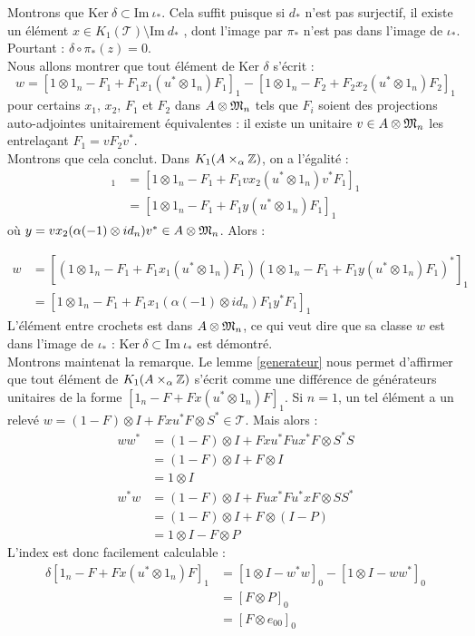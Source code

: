 \begin{dem}
Montrons que $\text{Ker}\ \delta \subset \text{Im}\ \iota_*$. Cela suffit puisque si $d_*$ n'est pas surjectif, il existe un élément $x\in K_1(\mathcal T)\setminus \text{Im}\ d_*$ , dont l'image par $\pi_*$ n'est pas dans l'image de $\iota_*$. Pourtant : $\delta\circ\pi_*( z) =0$.\\

Nous allons montrer que tout élément de $\text{Ker }\delta$ s'écrit :
\[w=[1\otimes 1_n -F_1+F_1x_1(u^*\otimes 1_n)F_1]_1-[1\otimes 1_n -F_2+F_2x_2(u^*\otimes 1_n)F_2]_1\]
pour certains $x_1$, $x_2$, $F_1$ et $F_2$ dans $A\otimes \frak M_n$ tels que $F_i$ soient des projections auto-adjointes unitairement équivalentes : il existe un unitaire $v\in A\otimes \frak M_n$ les entrelaçant $F_1=vF_2v^*$.\\

Montrons que cela conclut. Dans $K_1(A\times_\alpha \mathbb Z)$, on a l'égalité :
\begin{align*}
[1\otimes 1_n -F_2+F_2x_2(u^*\otimes 1_n)F_2]_1 & =[1\otimes 1_n -F_1+F_1 v x_2(u^*\otimes 1_n)v^* F_1]_1 \\
								& = [1\otimes 1_n -F_1+F_1 y (u^*\otimes 1_n)F_1]_1
\end{align*}
où $y=vx_2(\alpha(-1)\otimes id_n)v^*\in A\otimes \frak M_n$. Alors :

\begin{align*}
w & =[\left(1\otimes 1_n -F_1+F_1x_1(u^*\otimes 1_n)F_1\right)\left(1\otimes 1_n -F_1+F_1 y (u^*\otimes 1_n)F_1\right)^*]_1 \\
    & = [1\otimes 1_n -F_1+F_1 x_1 (\alpha(-1)\otimes id_n) F_1 y^* F_1]_1
\end{align*}
L'élément entre crochets est dans $A\otimes \frak M_n$, ce qui veut dire que sa classe $w$ est dans l'image de $\iota_*$ : $\text{Ker}\ \delta \subset \text{Im}\ \iota_*$ est démontré.\\

Montrons maintenat la remarque. Le lemme \ref{generateur} nous permet d'affirmer que tout élément de $K_1(A\times_\alpha \mathbb Z)$ s'écrit comme une différence de générateurs unitaires de la forme $[1_n-F+Fx(u^*\otimes 1_n)F]_1$. Si $n=1$, un tel élément a un relevé $w=(1-F)\otimes I+Fxu^*F\otimes S^*\in\mathcal T$. Mais alors :
\begin{align*}
ww^* &=(1-F)\otimes I + Fxu^*Fux^*F\otimes S^*S \\
	&=(1-F)\otimes I +F\otimes I  \\
            & = 1\otimes I  \\
w^*w &=(1-F)\otimes I + Fux^*Fu^*xF\otimes SS^* \\
	&=(1-F)\otimes I +F\otimes (I-P)\\
           & = 1\otimes I-F\otimes P
\end{align*}
L'index est donc facilement calculable :
\begin{align*}\delta[1_n-F+Fx(u^*\otimes 1_n)F]_1 & =[1\otimes I -w^*w]_0-[1\otimes I -ww^*]_0 \\
&=[F\otimes P]_0\\
&=[F\otimes e_{00}]_0
\end{align*}


\end{dem}

